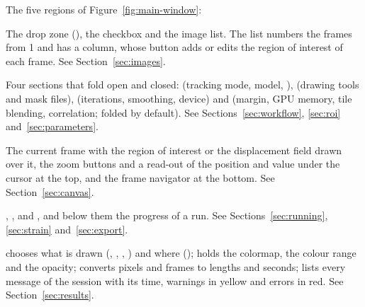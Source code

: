 
The five regions of Figure~\ref{fig:main-window}:

\begin{description}[leftmargin=0.6cm,style=nextline]
  \item[1. IMAGES]
    The drop zone (), the 
    checkbox and the image list. The list numbers the frames from 1 and has a 
    column, whose button adds or edits the region of interest of each frame. See
    Section~\ref{sec:images}.
  \item[2. The settings column]
    Four sections that fold open and closed:  (tracking mode, model,
    ),  (drawing tools and mask files),
     (iterations, smoothing, device) and  (margin, GPU memory, tile
    blending, correlation; folded by default). See Sections~\ref{sec:workflow},
    \ref{sec:roi} and~\ref{sec:parameters}.
  \item[3. The canvas]
    The current frame with the region of interest or the displacement field drawn over it, the
    zoom buttons and a read-out of the position and value under the cursor at the top, and the
    frame navigator at the bottom. See Section~\ref{sec:canvas}.
  \item[4. Run controls and PROGRESS]
    , ,  and , and below
    them the progress of a run. See Sections~\ref{sec:running}, \ref{sec:strain}
    and~\ref{sec:export}.
  \item[5. Display and log]
     chooses what is drawn (, , , ) and
    where ();  holds the colormap, the colour range and the opacity;
     converts pixels and frames to lengths and seconds;  lists every
    message of the session with its time, warnings in yellow and errors in red. See Section~\ref{sec:results}.
\end{description}

